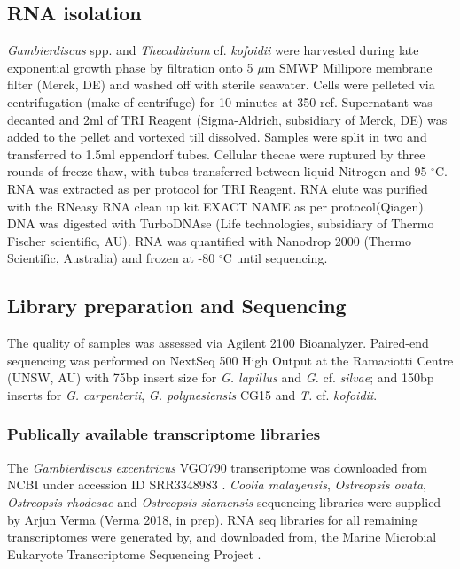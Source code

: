 \documentclass[12pt]{article}
\begin{document}
\subsection*{RNA isolation}
\emph{Gambierdiscus} spp. and \emph{Thecadinium} cf. \emph{kofoidii} were harvested during late exponential growth phase by filtration onto 5 $\mu$m SMWP Millipore membrane filter (Merck, DE) and washed off with sterile seawater. 
Cells were pelleted via centrifugation (make of centrifuge) for 10 minutes at 350 rcf. 
Supernatant was decanted and 2ml of TRI Reagent (Sigma-Aldrich, subsidiary of Merck, DE) was added to the pellet and vortexed till dissolved. 
Samples were split in two and transferred to 1.5ml eppendorf tubes. 
Cellular thecae were ruptured by three rounds of freeze-thaw, with tubes transferred between liquid Nitrogen and 95 $^{\circ}$C. 
RNA was extracted as per protocol for TRI Reagent. 
RNA elute was purified with the RNeasy RNA clean up kit EXACT NAME as per protocol(Qiagen). 
DNA was digested with TurboDNAse (Life technologies, subsidiary of Thermo Fischer scientific, AU). 
RNA was quantified with Nanodrop 2000 (Thermo Scientific, Australia) and frozen at -80 $^{\circ}$C until sequencing.
 
\subsection*{Library preparation and Sequencing}
The quality of samples was assessed via Agilent 2100 Bioanalyzer. 
Paired-end sequencing was performed on NextSeq 500 High Output at the Ramaciotti Centre (UNSW, AU) with 75bp insert size for \emph{G. lapillus} and \emph{G.} cf. \emph{silvae}; and 150bp inserts for \emph{G. carpenterii}, \emph{G. polynesiensis} CG15 and \emph{T.} cf. \emph{kofoidii}.

\subsubsection*{Publically available transcriptome libraries}
The \emph{Gambierdiscus excentricus} VGO790 transcriptome was downloaded from NCBI under accession ID SRR3348983 \cite{kohli2017role}. 
\textit{Coolia malayensis}, \textit{Ostreopsis ovata}, \textit{Ostreopsis rhodesae} and \textit{Ostreopsis siamensis} sequencing libraries were supplied by Arjun Verma (Verma 2018, in prep). 
RNA seq libraries for all remaining transcriptomes were generated by, and downloaded from, the Marine Microbial Eukaryote Transcriptome Sequencing Project \citep{keeling2014marine}.
\end{document}

